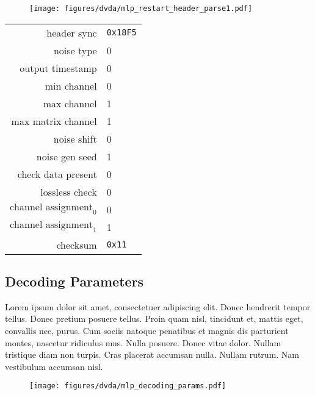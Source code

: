 \begin{figure}[h]
  \texttt{[image: figures/dvda/mlp\_restart\_header\_parse1.pdf]}
\end{figure}
\begin{table}[h]
{
  \begin{tabular}{rl}
    header sync & \texttt{0x18F5} \\
    noise type & 0 \\
    output timestamp & 0 \\
    min channel & 0 \\
    max channel & 1 \\
    max matrix channel & 1 \\
    noise shift & 0 \\
    noise gen seed & 1 \\
    check data present & 0 \\
    lossless check & 0 \\
    $\text{channel assignment}_0$ & 0 \\
    $\text{channel assignment}_1$ & 1 \\
    checksum & \texttt{0x11} \\
  \end{tabular}
}
\end{table}

\clearpage

\subsection{Decoding Parameters}


Lorem ipsum dolor sit amet, consectetuer adipiscing elit. Donec hendrerit tempor tellus. Donec pretium posuere tellus. Proin quam nisl, tincidunt et, mattis eget, convallis nec, purus. Cum sociis natoque penatibus et magnis dis parturient montes, nascetur ridiculus mus. Nulla posuere. Donec vitae dolor. Nullam tristique diam non turpis. Cras placerat accumsan nulla. Nullam rutrum. Nam vestibulum accumsan nisl.

\clearpage

\begin{figure}[h]
  \texttt{[image: figures/dvda/mlp\_decoding\_params.pdf]}
\end{figure}

\clearpage

